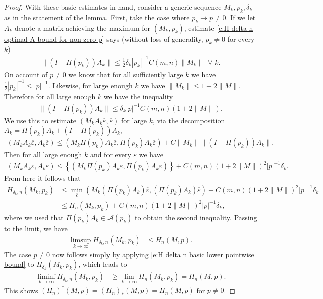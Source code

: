 \documentclass[10pt,a4paper]{amsart}
\begin{document}
\begin{proof}
With these basic estimates in hand, consider a generic sequence $M_k,p_k,\delta_k$ as in the statement of the lemma. First, take the case where $p_k \to p \neq 0$. If we let $A_k$ denote a matrix achieving the maximum for $(M_k,p_k)$, estimate \eqref{e:H delta n optimal A bound for non zero p} says (without loss of generality, $p_k \neq 0$ for every $k$)
\begin{align*}
  \|(I-\Pi(p_k))A_k\|\leq \tfrac{1}{2}\delta_k |p_k|^{-1} C(m,n)\|M_k\|\;\;\forall\;k.
\end{align*}
On account of $p \neq 0$ we know that for all sufficiently large $k$ we have $\tfrac{1}{2}|p_k|^{-1}\leq |p|^{-1}$. Likewise, for large enough $k$ we have $\|M_k\|\leq 1+ 2\|M\|$. Therefore for all large enough $k$ we have the inequality
\begin{align*}
  \|(I-\Pi(p_k))A_k\| \leq \delta_k |p|^{-1}C(m,n)(1+ 2\|M\|).    
\end{align*}
We use this to estimate $(M_kA_k\overline \varepsilon,\overline \varepsilon)$ for large $k$, via the decomposition $A_k = \Pi(p_k)A_k+(I-\Pi(p_k))A_k$,  
\begin{align*}
  (M_kA_k\overline \varepsilon, A_k\overline \varepsilon) \leq (M_k\Pi(p_k)A_k \overline\varepsilon,\Pi(p_k)A_k \overline \varepsilon) + C\|M_k\|\|(I-\Pi(p_k))A_k\|. 
\end{align*}
Then for all large enough $k$ and for every $\overline \varepsilon$ we have
\begin{align*}
  (M_kA_k\overline \varepsilon, A_k\overline \varepsilon) \leq \left \{ (M_k\Pi(p_k)A_k \overline\varepsilon,\Pi(p_k)A_k \overline \varepsilon)\right \} + C(m,n)(1+2\|M\|)^2|p|^{-1}\delta_k. 
\end{align*}
 From here it follows that
\begin{align*}
   H_{\delta_k,n}(M_k,p_k) & \leq \min_{\overline\varepsilon}(M_k(\Pi(p_k)A_k)\overline\varepsilon, (\Pi(p_k)A_k)\overline \varepsilon) + C(m,n)(1+2\|M\|)^2|p|^{-1}\delta_k\\
   & \leq H_n(M_k,p_k) + C(m,n)(1+2\|M\|)^2|p|^{-1}\delta_k,
\end{align*}
where we used that $\Pi(p_k)A_k \in \mathcal{A}(p_k)$ to obtain the second inequality. Passing to the limit, we have
\begin{align*}
   \limsup_{k \to \infty} H_{\delta_k,n}(M_k,p_k) & \leq H_n(M,p).
\end{align*}
The case $p\neq 0$ now follows simply by applying \eqref{e:H delta n basic lower pointwise bound} to $H_{\delta_k}(M_k,p_k)$, which leads to 
\begin{align*}
   \liminf \limits_{k \to \infty} H_{\delta_k,n}(M_k,p_k) & \geq \lim \limits_{k\to \infty} H_n(M_k,p_k) = H_n(M,p).
\end{align*}
This shows $(H_n)^*(M,p) = (H_n)_*(M,p) = H_n(M,p)$ for $p\neq 0$.


\end{proof}
\end{document}
